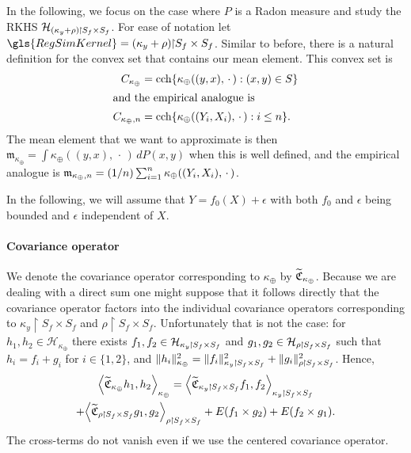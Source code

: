 \documentclass[AHL,Unicode,longabstracts,published]{cedram}
\theoremstyle{remark}
\DeclareMathOperator{\cch}{cch}
\newcommand{\restrr}
{\!\!\upharpoonright\!\!}
\newcommand{\cH}{\mathcal{H}}
\newcommand{\fkC}{\mathfrak{C}}
\newcommand{\Cov}{\tilde{\fkC}}
\newcommand{\mean}{\mathfrak{m}}
\newcommand*{\mk}{\mkern -1mu}
\let\oldtilde\tilde
\renewcommand*{\tilde}[1]{\mathchoice{\widetilde{#1}}{\widetilde{#1}}{\oldtilde{#1}}{\oldtilde{#1}}}
\let\originalleft\left
\let\originalright\right
\renewcommand{\left}{\mathopen{}\mathclose\bgroup\originalleft}
\renewcommand{\right}{\aftergroup\egroup\originalright}
\begin{document}
In the following, we focus on the case where $P$ is a Radon measure and study the RKHS $\cH_{(\kappa_y + \rho)\mk\upharpoonright\mk S_f \times S_f}$. For ease of notation let $\gls{RegSimKernel} = (\kappa_y + \rho)\restrr S_f \times S_f$. Similar to before, there is a natural definition for the convex set that contains our mean element. This convex set is
\begin{align*}
C_{\kappa_\oplus} &= \cch \{\kappa_{\oplus}((y,x),\,\cdot\,) : (x,y) \in S\}
\\
\intertext{and the empirical analogue is}
C_{\kappa_\oplus,n} &= \cch \{ \kappa_{\oplus}((Y_i,X_i),\,\cdot\,) : i \leq n\}.
\end{align*}
The mean element that we want to approximate is then $\mean_{\kappa_\oplus} = \int \kappa_{\oplus}((y,x),\,\cdot\,) \,dP(x,y)$ when this is well defined, and the empirical analogue is $\mean_{\kappa_\oplus,n} = (1/n) \sum_{i=1}^n \kappa_{\oplus}((Y_i,\linebreak X_i),\,\cdot\,)$.


In the following, we will assume that $Y = f_0(X) + \epsilon$ with both $f_0$ and $\epsilon$ being bounded and $\epsilon$ independent of $X$.

\paragraph{Covariance operator}
We denote the covariance operator corresponding to $\kappa_\oplus$ by $\Cov_{\kappa_\oplus}$. Because we are dealing with a direct sum one might suppose that it follows directly that the covariance operator factors into the individual covariance operators corresponding to $\kappa_y \restrr S_f \times S_f$ and $\rho\restrr S_f \times S_f$. Unfortunately that is not the case: for $h_1,h_2 \in \cH_{\kappa_\oplus}$ there exists $f_1,f_2 \in \cH_{\kappa_y\mk \upharpoonright\mk S_f \times S_f}$ and $g_1,g_2\in \cH_{\rho\mk \upharpoonright\mk S_f \times S_f }$ such that $h_i = f_i + g_i$ for $i \in \{1,2\}$, and $\|h_i\|^2_{\kappa_\oplus} = \|f_i\|^2_{\kappa_y \mk\upharpoonright\mk S_f \times S_f} + \|g_i\|^2_{\rho \mk\upharpoonright\mk S_f \times S_f }$. Hence,
\begin{multline} \label{eq:cov_for_directsum}
\left\langle \Cov_{\kappa_\oplus} h_1, h_2 \right\rangle_{\kappa_\oplus} =
\left\langle \Cov_{\kappa_y \mk\upharpoonright\mk S_f \times S_f} f_1, f_2 \right\rangle_{\kappa_y\mk\upharpoonright\mk S_f \times S_f}\\
+\left\langle \Cov_{\rho\mk\upharpoonright\mk S_f \times S_f} g_1, g_2 \right\rangle_{\rho\mk\upharpoonright\mk S_f \times S_f} + E(f_1 \times g_2) + E(f_2 \times g_1).
\end{multline}
The cross-terms do not vanish even if we use the centered covariance operator.
\end{document}
